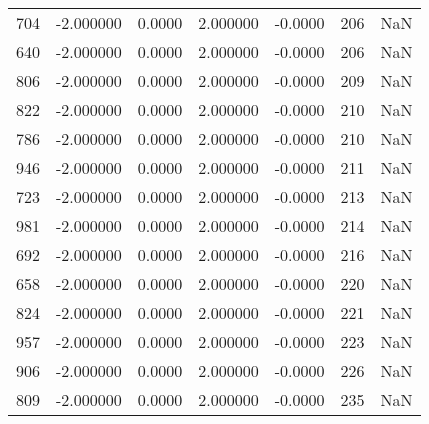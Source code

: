 \begin{tabular}{rrrrrrr}
 704 &   -2.000000 &    0.0000 &    2.000000 &     -0.0000 &         206 & NaN \\
 640 &   -2.000000 &    0.0000 &    2.000000 &     -0.0000 &         206 & NaN \\
 806 &   -2.000000 &    0.0000 &    2.000000 &     -0.0000 &         209 & NaN \\
 822 &   -2.000000 &    0.0000 &    2.000000 &     -0.0000 &         210 & NaN \\
 786 &   -2.000000 &    0.0000 &    2.000000 &     -0.0000 &         210 & NaN \\
 946 &   -2.000000 &    0.0000 &    2.000000 &     -0.0000 &         211 & NaN \\
 723 &   -2.000000 &    0.0000 &    2.000000 &     -0.0000 &         213 & NaN \\
 981 &   -2.000000 &    0.0000 &    2.000000 &     -0.0000 &         214 & NaN \\
 692 &   -2.000000 &    0.0000 &    2.000000 &     -0.0000 &         216 & NaN \\
 658 &   -2.000000 &    0.0000 &    2.000000 &     -0.0000 &         220 & NaN \\
 824 &   -2.000000 &    0.0000 &    2.000000 &     -0.0000 &         221 & NaN \\
 957 &   -2.000000 &    0.0000 &    2.000000 &     -0.0000 &         223 & NaN \\
 906 &   -2.000000 &    0.0000 &    2.000000 &     -0.0000 &         226 & NaN \\
 809 &   -2.000000 &    0.0000 &    2.000000 &     -0.0000 &         235 & NaN \\
\bottomrule
\end{tabular}
